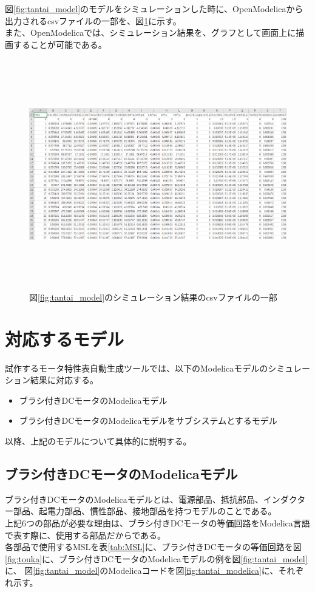 図\ref{fig:tantai_model}のモデルをシミュレーションした時に、OpenModelicaから出力されるcsvファイルの一部を、図\ref{fig:simyu_csv}に示す。\\
また、OpenModelicaでは、シミュレーション結果を、グラフとして画面上に描画することが可能である。
\begin{figure}[t]
	\centering
	\includegraphics[width=16.5cm,height=10cm]{./Image/simyu_csv.png}
	\caption{図\ref{fig:tantai_model}のシミュレーション結果のcsvファイルの一部}
	\label{fig:simyu_csv}
\end{figure}

\section{対応するモデル}\label{taioumodel}
試作するモータ特性表自動生成ツールでは、以下のModelicaモデルのシミュレーション結果に対応する。
\begin{itemize}
	\item ブラシ付きDCモータのModelicaモデル
	\item ブラシ付きDCモータのModelicaモデルをサブシステムとするモデル
\end{itemize}
以降、上記のモデルについて具体的に説明する。

\subsection{ブラシ付きDCモータのModelicaモデル}\label{sub:tanntai}
ブラシ付きDCモータのModelicaモデルとは、電源部品、抵抗部品、インダクター部品、起電力部品、慣性部品、接地部品を持つモデルのことである。\\
上記6つの部品が必要な理由は、ブラシ付きDCモータの等価回路\cite{等価回路}をModelica言語で表す際に、使用する部品\cite{modelicaシステム本}だからである。\\
各部品で使用するMSLを表\ref{tab:MSL}に、ブラシ付きDCモータの等価回路を図\ref{fig:touka}に、ブラシ付きDCモータのModelicaモデルの例を図\ref{fig:tantai_model}に、
図\ref{fig:tantai_model}のModelicaコードを図\ref{fig:tantai_modelica}に、それぞれ示す。

